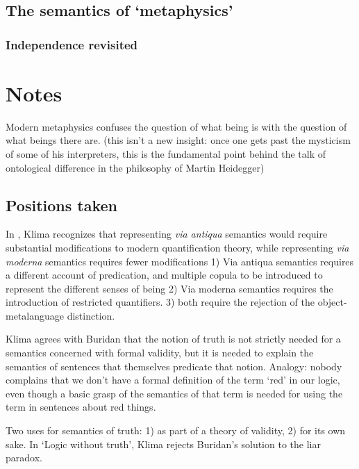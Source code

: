 \documentclass[]{article}
\begin{document}
\subsection{The semantics of `metaphysics'}
\subsubsection{Independence revisited}
\section{Notes}
Modern metaphysics confuses the question of what being is with the question of what beings there are. (this isn't a new insight: once one gets past the mysticism of some of his interpreters, this is the fundamental point behind the talk of ontological difference in the philosophy of Martin Heidegger)
\subsection{Positions taken}
In \autocite{Klima2008a}, Klima recognizes that representing \emph{via antiqua} semantics would require substantial modifications to modern quantification theory, while representing \emph{via moderna} semantics requires fewer modifications
1) Via antiqua semantics requires a different account of predication, and multiple copula to be introduced to represent the different senses of being
2) Via moderna semantics requires the introduction of restricted quantifiers.
3) both require the rejection of the object-metalanguage distinction.

Klima agrees with Buridan that the notion of truth is not strictly needed for a semantics concerned with formal validity, but it is needed to explain the semantics of sentences that themselves predicate that notion.
Analogy: nobody complains that we don't have a formal definition of the term `red' in our logic, even though a basic grasp of the semantics of that term is needed for using the term in sentences about red things.

Two uses for semantics of truth: 1) as part of a theory of validity, 2) for its own sake.
In `Logic without truth', Klima rejects Buridan's solution to the liar paradox.

\end{document}
